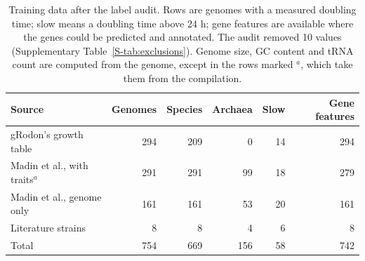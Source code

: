 \begin{table}[t]\centering\footnotesize\setlength{\tabcolsep}{3pt}
\caption{Training data after the label audit. Rows are genomes with a measured doubling time; slow means a doubling time above 24 h; gene features are available where the genes could be predicted and annotated. The audit removed 10 values (Supplementary Table~\ref{S-tab:exclusions}). Genome size, GC content and tRNA count are computed from the genome, except in the rows marked $^{a}$, which take them from the compilation.}\label{tab:data}
\begin{tabular}{lrrrrr}
\toprule
Source & Genomes & Species & Archaea & Slow & Gene features \\
\midrule
gRodon's growth table & 294 & 209 & 0 & 14 & 294 \\
Madin et al., with traits$^{a}$ & 291 & 291 & 99 & 18 & 279 \\
Madin et al., genome only & 161 & 161 & 53 & 20 & 161 \\
Literature strains & 8 & 8 & 4 & 6 & 8 \\
\midrule
Total & 754 & 669 & 156 & 58 & 742 \\
\bottomrule
\end{tabular}
\end{table}
